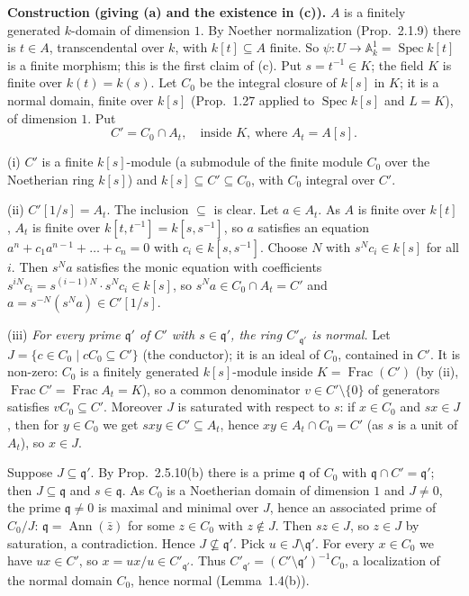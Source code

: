 \documentclass[11pt]{article}
\begin{document}
\textbf{Construction (giving (a) and the existence in (c)).} $A$ is a finitely generated $k$-domain of dimension $1$. By Noether normalization (Prop.~2.1.9) there is $t\in A$, transcendental over $k$, with $k[t]\subseteq A$ finite. So $\psi:U\to\mathbb A^1_k=\operatorname{Spec}k[t]$ is a finite morphism; this is the first claim of (c). Put $s=t^{-1}\in K$; the field $K$ is finite over $k(t)=k(s)$. Let $C_0$ be the integral closure of $k[s]$ in $K$; it is a normal domain, finite over $k[s]$ (Prop.~1.27 applied to $\operatorname{Spec}k[s]$ and $L=K$), of dimension $1$. Put
\[ C'=C_0\cap A_t,\quad\text{inside }K,\ \text{where }A_t=A[s]. \]

(i) $C'$ is a finite $k[s]$-module (a submodule of the finite module $C_0$ over the Noetherian ring $k[s]$) and $k[s]\subseteq C'\subseteq C_0$, with $C_0$ integral over $C'$.

(ii) $C'[1/s]=A_t$. The inclusion $\subseteq$ is clear. Let $a\in A_t$. As $A$ is finite over $k[t]$, $A_t$ is finite over $k[t,t^{-1}]=k[s,s^{-1}]$, so $a$ satisfies an equation $a^n+c_1a^{n-1}+\dots+c_n=0$ with $c_i\in k[s,s^{-1}]$. Choose $N$ with $s^Nc_i\in k[s]$ for all $i$. Then $s^Na$ satisfies the monic equation with coefficients $s^{iN}c_i=s^{(i-1)N}\cdot s^Nc_i\in k[s]$, so $s^Na\in C_0\cap A_t=C'$ and $a=s^{-N}(s^Na)\in C'[1/s]$.

(iii) \emph{For every prime $\mathfrak q'$ of $C'$ with $s\in\mathfrak q'$, the ring $C'_{\mathfrak q'}$ is normal.} Let $J=\{c\in C_0\mid cC_0\subseteq C'\}$ (the conductor); it is an ideal of $C_0$, contained in $C'$. It is non-zero: $C_0$ is a finitely generated $k[s]$-module inside $K=\operatorname{Frac}(C')$ (by (ii), $\operatorname{Frac}C'=\operatorname{Frac}A_t=K$), so a common denominator $v\in C'\setminus\{0\}$ of generators satisfies $vC_0\subseteq C'$. Moreover $J$ is saturated with respect to $s$: if $x\in C_0$ and $sx\in J$, then for $y\in C_0$ we get $sxy\in C'\subseteq A_t$, hence $xy\in A_t\cap C_0=C'$ (as $s$ is a unit of $A_t$), so $x\in J$.

Suppose $J\subseteq\mathfrak q'$. By Prop.~2.5.10(b) there is a prime $\mathfrak q$ of $C_0$ with $\mathfrak q\cap C'=\mathfrak q'$; then $J\subseteq\mathfrak q$ and $s\in\mathfrak q$. As $C_0$ is a Noetherian domain of dimension $1$ and $J\neq0$, the prime $\mathfrak q\neq0$ is maximal and minimal over $J$, hence an associated prime of $C_0/J$: $\mathfrak q=\operatorname{Ann}(\bar z)$ for some $z\in C_0$ with $z\notin J$. Then $sz\in J$, so $z\in J$ by saturation, a contradiction. Hence $J\not\subseteq\mathfrak q'$. Pick $u\in J\setminus\mathfrak q'$. For every $x\in C_0$ we have $ux\in C'$, so $x=ux/u\in C'_{\mathfrak q'}$. Thus $C'_{\mathfrak q'}=(C'\setminus\mathfrak q')^{-1}C_0$, a localization of the normal domain $C_0$, hence normal (Lemma~1.4(b)).
\end{document}
